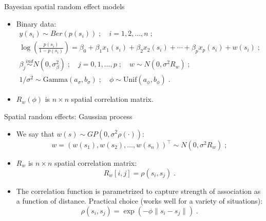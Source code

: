 \documentclass[xcolor=pdftex,dvipsnames,table,numbers,hyperref={pdfpagelabels=false},compress]{beamer}
\begin{document}
\begin{frame}{Bayesian spatial random effect models}
 
\begin{itemize}\setlength{\itemsep}{0.4cm}
 \item Binary data:
 \begin{multline*}
   y(s_i) \sim Ber(p(s_i))\;;\quad i=1,2,\ldots,n\;;\\
   \log\left(\frac{p(s_i)}{1-p(s_i)}\right) = \beta_0 + \beta_1 x_{1}(s_i) + \beta_2 x_{2}(s_i) + \cdots + \beta_p x_{p}(s_i) + w(s_i)\;; \\
   \beta_j \stackrel{ind}{\sim} N(0, \sigma^2_{\beta})\;; \quad j=0,1,\ldots,p\;;\quad w \sim N(0,\sigma^2R_w)\;; \\
   1/\sigma^2 \sim \mbox{Gamma}(a_{\sigma},b_{\sigma})\;;\quad \phi\sim \mbox{Unif}(a_{\phi}, b_{\phi})\;.
  \end{multline*}
 \item $R_w(\phi)$ is $n\times n$ spatial correlation matrix.   
\end{itemize}

\end{frame}

\begin{frame}{Spatial random effects: Gaussian process}
 
 \begin{itemize}
  \item We say that $w(s) \sim GP(0, \sigma^2\rho(\cdot))$:
  \[
   w = (w(s_1), w(s_2),\ldots, w(s_n))^{\top} \sim N(0,\sigma^2 R_w)\;;
  \]
  
  \item $R_w$ is $n\times n$ spatial correlation matrix:
  \[
   R_{w}[i,j] = \rho(s_i, s_j)\;.
  \]

  \item The correlation function is parametrized to capture strength of association as a function of distance. Practical choice (works well for a variety of situations):
  \[
   \rho(s_i, s_j) = \exp(-\phi \|s_i-s_j\|)\;.
  \]

 \end{itemize}
 
\end{frame}
\end{document}
